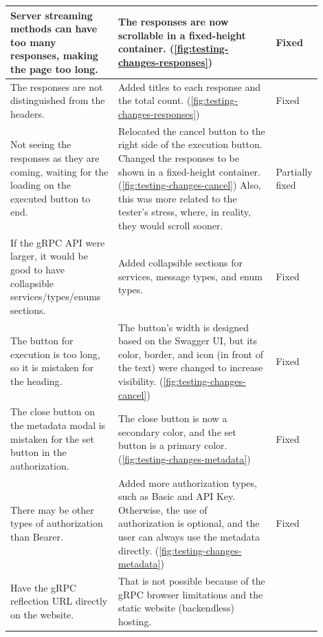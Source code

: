 \begin{table}[!htb]
{\begin{tabular}{|p{0.35\linewidth}|p{0.55\linewidth}|l|}
            \hline
            Server streaming methods can have too many responses, making the page too long.
            & The responses are now scrollable in a fixed-height container.
            (\ref{fig:testing-changes-responses})
            & Fixed \\
            \hline
            The responses are not distinguished from the headers.
            & Added titles to each response and the total count.
            (\ref{fig:testing-changes-responses})
            & Fixed \\
            \hline
            Not seeing the responses as they are coming, waiting for the loading on the executed button to end.
            & Relocated the cancel button to the right side of the execution button.
            Changed the responses to be shown in a fixed-height container.
            (\ref{fig:testing-changes-cancel})
            Also, this was more related to the tester's stress, where, in reality, they would scroll sooner.
            & Partially fixed \\
            \hline
            If the gRPC API were larger, it would be good to have collapsible services/types/enums sections.
            & Added collapsible sections for services, message types, and enum types.
            & Fixed \\
            \hline
            The button for execution is too long, so it is mistaken for the heading.
            & The button's width is designed based on the Swagger UI, but its color, border, and icon (in front of the text) were changed to increase visibility.
            (\ref{fig:testing-changes-cancel})
            & Fixed \\
            \hline
            The close button on the metadata modal is mistaken for the set button in the authorization.
            & The close button is now a secondary color, and the set button is a primary color.
            (\ref{fig:testing-changes-metadata})
            & Fixed \\
            \hline
            There may be other types of authorization than Bearer.
            & Added more authorization types, such as Basic and API Key.
            Otherwise, the use of authorization is optional, and the user can always use the metadata directly.
            (\ref{fig:testing-changes-metadata})
            & Fixed \\
            \hline
            Have the gRPC reflection URL directly on the website.
            & That is not possible because of the gRPC browser limitations and the static website (backendless) hosting.

\end{tabular}}
\end{table}
